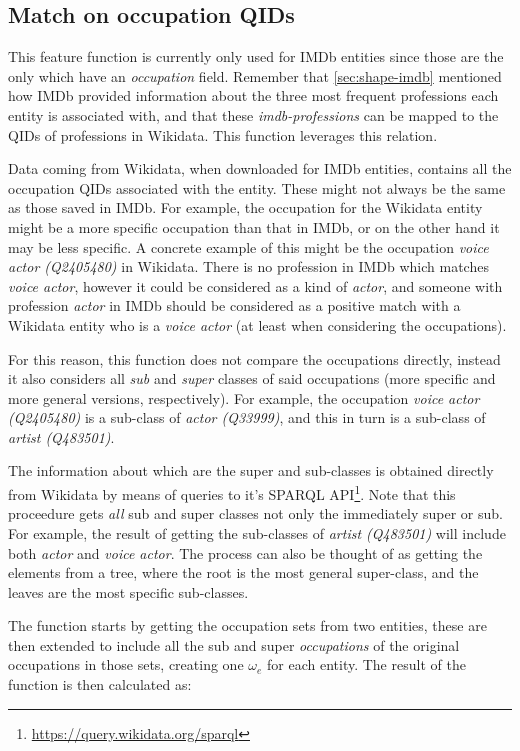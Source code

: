 \documentclass[epsfig,a4paper,11pt,titlepage,twoside,openany]{book}
\newcommand{\footurl}[1]{\footnote{\url{#1}}}
\begin{document}
\subsection{Match on occupation QIDs}
\label{sec:feature-occupations}

This feature function is currently only used for IMDb entities since those are the only which have an \textit{occupation} field. Remember that \autoref{sec:shape-imdb} mentioned how IMDb provided information about the three most frequent professions each entity is associated with, and that these \textit{imdb-professions} can be mapped to the QIDs of professions in Wikidata. This function leverages this relation. 

Data coming from Wikidata, when downloaded for IMDb entities, contains all the occupation QIDs associated with the entity. These might not always be the same as those saved in IMDb. For example, the occupation for the Wikidata entity might be a more specific occupation than that in IMDb, or on the other hand it may be less specific. A concrete example of this might be the occupation \textit{voice actor (Q2405480)} in Wikidata. There is no profession in IMDb which matches \textit{voice actor}, however it could be considered as a kind of \textit{actor}, and someone with profession \textit{actor} in IMDb should be considered as a positive match with a Wikidata entity who is a \textit{voice actor} (at least when considering the occupations).

For this reason, this function does not compare the occupations directly, instead it also considers all \textit{sub} and \textit{super} classes of said occupations (more specific and more general versions, respectively). For example, the occupation \textit{voice actor (Q2405480)} is a sub-class of \textit{actor (Q33999)}, and this in turn is a sub-class of \textit{artist (Q483501)}. 

The information about which are the super and sub-classes is obtained directly from Wikidata by means of queries to it's SPARQL API\footurl{https://query.wikidata.org/sparql}. Note that this proceedure gets \textit{all} sub and super classes not only the immediately super or sub. For example, the result of getting the sub-classes of \textit{artist (Q483501)} will include both \textit{actor} and \textit{voice actor}. The process can also be thought of as getting the elements from a tree, where the root is the most general super-class, and the leaves are the most specific sub-classes. 

The function starts by getting the occupation sets from two entities, these are then extended to include all the sub and super \textit{occupations} of the original occupations in those sets, creating one $\omega_e$ for each entity. The result of the function is then calculated as:
\end{document}
